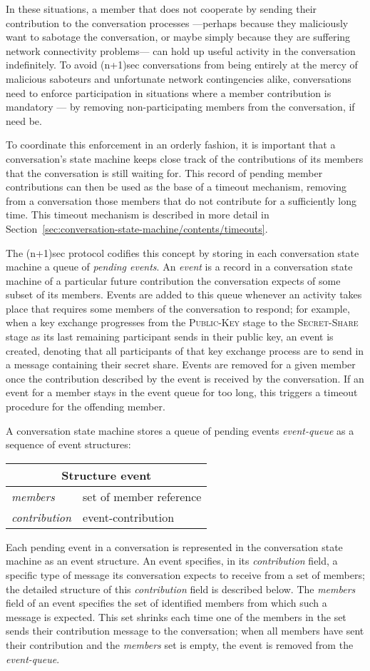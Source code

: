 \documentclass{article}
\def\smfield#1{\textsl{#1}}
\def\type#1{\textsf{#1}}
\newenvironment{struct}[1]{
\newcommand{\structfield}[2]{
\smfield{##1} & \type{##2} \\
\hline
}
\par
\vspace{-\medskipamount}
\hspace{2em minus 2em}\begin{tabular}{|l|l|}
\hline
\multicolumn{2}{|c|}{Structure \type{#1}} \\
\hline
\hline
}{
\end{tabular}
\vspace{-\medskipamount}
\par
}
\begin{document}
In these situations, a member that does not cooperate by sending their contribution to the conversation processes ---perhaps because they maliciously want to sabotage the conversation, or maybe simply because they are suffering network connectivity problems--- can hold up useful activity in the conversation indefinitely.
To avoid (n+1)sec conversations from being entirely at the mercy of malicious saboteurs and unfortunate network contingencies alike, conversations need to enforce participation in situations where a member contribution is mandatory --- by removing non-participating members from the conversation, if need be.

To coordinate this enforcement in an orderly fashion, it is important that a conversation's state machine keeps close track of the contributions of its members that the conversation is still waiting for.
This record of pending member contributions can then be used as the base of a timeout mechanism, removing from a conversation those members that do not contribute for a sufficiently long time.
This timeout mechanism is described in more detail in Section~\ref{sec:conversation-state-machine/contents/timeouts}.

The (n+1)sec protocol codifies this concept by storing in each conversation state machine a queue of \emph{pending events}.
An \emph{event} is a record in a conversation state machine of a particular future contribution the conversation expects of some subset of its members.
Events are added to this queue whenever an activity takes place that requires some members of the conversation to respond; for example, when a key exchange progresses from the \textsc{Public-Key} stage to the \textsc{Secret-Share} stage as its last remaining participant sends in their public key, an event is created, denoting that all participants of that key exchange process are to send in a message containing their secret share.
Events are removed for a given member once the contribution described by the event is received by the conversation.
If an event for a member stays in the event queue for too long, this triggers a timeout procedure for the offending member.


A conversation state machine stores a queue of pending events \smfield{event-queue} as a sequence of \type{event} structures:
\begin{struct}{event}
\structfield{members}{set of member reference}
\structfield{contribution}{event-contribution}
\end{struct}
Each pending event in a conversation is represented in the conversation state machine as an \type{event} structure.
An event specifies, in its \smfield{contribution} field, a specific type of message its conversation expects to receive from a set of members; the detailed structure of this \smfield{contribution} field is described below.
The \smfield{members} field of an event specifies the set of identified members from which such a message is expected.
This set shrinks each time one of the members in the set sends their contribution message to the conversation; when all members have sent their contribution and the \smfield{members} set is empty, the event is removed from the \smfield{event-queue}.
\end{document}
